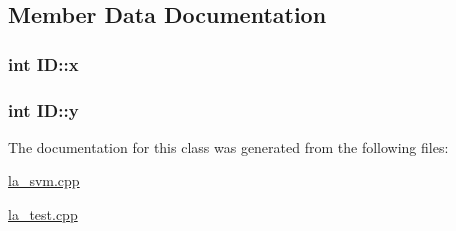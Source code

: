 \subsection{Member Data Documentation}
\hypertarget{class_i_d_a6525f6aac513b6c98d253979b4a09509}{
\subsubsection[{x}]{\setlength{\rightskip}{0pt plus 5cm}int I\+D\+::x}}\label{class_i_d_a6525f6aac513b6c98d253979b4a09509}
\hypertarget{class_i_d_a9dece9c4db67b1f7ff84ff9c50aaff34}{
\subsubsection[{y}]{\setlength{\rightskip}{0pt plus 5cm}int I\+D\+::y}}\label{class_i_d_a9dece9c4db67b1f7ff84ff9c50aaff34}


The documentation for this class was generated from the following files\+:\begin{DoxyCompactItemize}
\item 
\hyperlink{la__svm_8cpp}{la\+\_\+svm.\+cpp}\item 
\hyperlink{la__test_8cpp}{la\+\_\+test.\+cpp}\end{DoxyCompactItemize}
